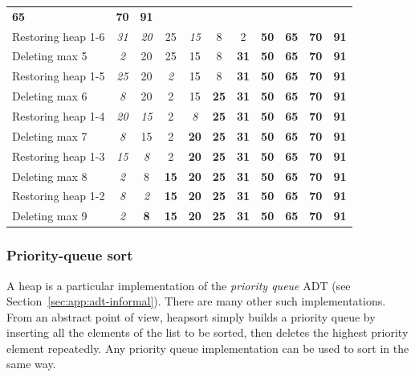 \begin{Example}
\begin{table}[htbp]
\begin{tabular}{|l|c|c|c|c|c|c|c|c|c|c|}
\textbf{65} & \textbf{70} & \textbf{91} 
\\ %
Restoring heap 1-6& \emph{31} & \emph{20}  & 25 & \emph{15} & 8 & 2 & 
\textbf{50} 
& \textbf{65} & \textbf{70} & \textbf{91} 
\\ \hline 
Deleting max 5& \emph{2} & 20 & 25 & 15 & 8 
& \textbf{31} & \textbf{50} & \textbf{65} & \textbf{70} & \textbf{91} 
\\ %
Restoring heap 1-5& \emph{25} & 20  & \emph{2} & 15 & 8 & \textbf{31} & 
\textbf{50} 
& \textbf{65} & \textbf{70} & \textbf{91} 
\\ \hline 
Deleting max 6& \emph{8} & 20 & 2 & 15 & \textbf{25} 
& \textbf{31} & \textbf{50} & \textbf{65} & \textbf{70} & \textbf{91} 
\\ %
Restoring heap 1-4& \emph{20} & \emph{15}  & 2 & \emph{8} & \textbf{25} & 
\textbf{31} & \textbf{50} 
& \textbf{65} & \textbf{70} & \textbf{91} 
\\ \hline
Deleting max 7& \emph{8} & 15 & 2 & \textbf{20} & \textbf{25} 
& \textbf{31} & \textbf{50} & \textbf{65} & \textbf{70} & \textbf{91} 
\\ %
Restoring heap 1-3& \emph{15} & \emph{8}  & 2 & \textbf{20} & \textbf{25} & 
\textbf{31} & \textbf{50} 
& \textbf{65} & \textbf{70} & \textbf{91} 
\\ \hline
Deleting max 8& \emph{2} & 8 & \textbf{15} & \textbf{20} & \textbf{25} 
& \textbf{31} & \textbf{50} & \textbf{65} & \textbf{70} & \textbf{91} 
\\ %
Restoring heap 1-2& \emph{8} & \emph{2}  & \textbf{15} & \textbf{20} & 
\textbf{25} & \textbf{31} & \textbf{50} 
& \textbf{65} & \textbf{70} & \textbf{91} 
\\ \hline 
Deleting max 9& \emph{2} & \textbf{8} & \textbf{15} & \textbf{20} & 
\textbf{25} 
& \textbf{31} & \textbf{50} & \textbf{65} & \textbf{70} & \textbf{91} 
\\ \hline 
\end{tabular}
\end{table}
\end{Example}


\subsubsection*{Priority-queue sort}

A heap is a particular implementation of the \emph{priority queue} ADT (see 
Section~\ref{sec:app:adt-informal}). There are many
other such implementations. From an abstract point of view, heapsort simply 
builds a priority queue by inserting all the elements of the list to be sorted, then 
deletes the highest priority element repeatedly. Any priority queue 
implementation can be used to sort in the same way. 

